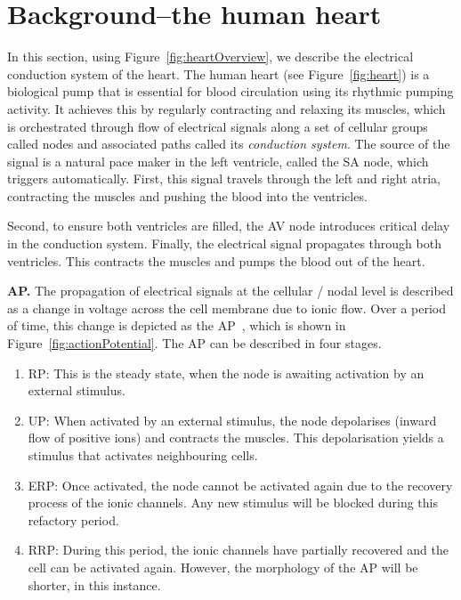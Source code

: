 \section{Background--the human heart }
\begin{figure*}[htbp]
	\centering
	
	\caption{Electrical conduction systems of the heart}
	\label{fig:heartOverview}
\end{figure*}

In this section, using Figure~\ref{fig:heartOverview}, we 
describe the electrical conduction system of the heart.
The human heart (see Figure~\ref{fig:heart})
 is a biological pump that is essential for blood circulation using its rhythmic 
pumping activity.
It achieves this by regularly contracting and relaxing its muscles,
which is orchestrated through flow of electrical signals along a set of cellular groups called nodes
and associated paths called its \emph{conduction system}.
The source of the signal is a natural pace maker in the left ventricle, called the \ac{SA} node,
which triggers automatically.
First, this signal travels through the left and right atria, contracting 
the muscles and pushing the blood into the ventricles.
 
Second, to ensure both ventricles are filled, 
the \ac{AV} node introduces critical delay 
in the conduction system.   
Finally, the electrical signal propagates through 
both ventricles. This contracts the muscles and pumps the blood out of the heart.


\noindent \textbf{\acf{AP}.} 
The propagation of electrical signals at the cellular / nodal level 
is described as a change in  voltage 
across the cell membrane due to ionic flow. Over a period of time, 
this change is depicted as the \acf{AP}~\cite{chen14}, which is shown in Figure~\ref{fig:actionPotential}. 
The \ac{AP} can be described in four stages.
\begin{enumerate}
	\item \acf{RP}: This is the steady state, when the node is awaiting 
					activation by an external stimulus.
	\item \acf{UP}: When activated by an external stimulus, 
					the node depolarises (inward flow of positive ions) and 
					contracts the muscles. This depolarisation yields 
					a stimulus that activates neighbouring cells.
	\item \acf{ERP}: Once activated, the node cannot be activated again 
					 due to the recovery process of the ionic channels. 
					 Any new stimulus will be blocked during this refactory period. 
	\item \acf{RRP}: During this period, the ionic channels have partially recovered
					 and the cell can be activated again. However, the morphology
					 of the \ac{AP} will be shorter, in this instance.
	
\end{enumerate}


